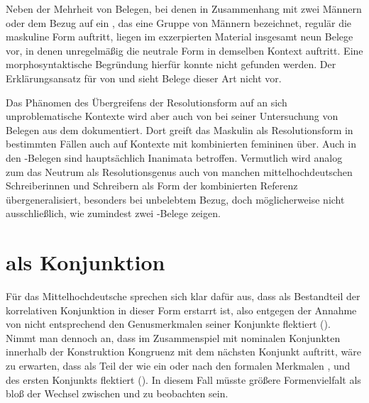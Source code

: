 Neben der Mehrheit von Belegen, bei denen in Zusammenhang mit zwei Männern oder
dem Bezug auf ein , das eine Gruppe von Männern bezeichnet,
regulär die maskuline Form  auftritt, liegen im exzerpierten
Material insgesamt neun Belege vor, in denen unregelmäßig die
neutrale Form  in demselben Kontext auftritt. Eine
morphosyntaktische Begründung hierfür konnte nicht gefunden werden. Der
Erklärungsansatz für  von \citet{wechsler2009} und
\citet{wechslerzlatic2003} sieht Belege dieser Art nicht vor.

Das Phänomen des Übergreifens der Resolutionsform auf an sich unproblematische
Kontexte wird aber auch von \citet[302]{corbett1991} bei seiner Untersuchung
von Belegen aus dem  dokumentiert. Dort greift das Maskulin als
Resolutionsform in bestimmten Fällen auch auf Kon\-texte mit kombinierten
femininen  über. Auch in den \CAO{}-Belegen sind hauptsächlich
Inanimata betroffen. Vermutlich wird analog zum  das Neutrum als
Resolutionsgenus auch von manchen
mittelhochdeutschen Schreiberinnen und Schreibern als
Form der kombinierten Referenz übergeneralisiert,
besonders bei unbelebtem Bezug, doch möglicherweise nicht ausschließlich, wie
zumindest zwei \KC-Belege zeigen.


\section{ als Konjunktion}
\label{sec:beideconj}

Für das Mittelhochdeutsche sprechen sich
\citet[626--627]{ksw2} klar dafür aus, dass  als Bestandteil der
korrelativen Konjunktion   in dieser Form erstarrt ist, also  entgegen der Annahme von
\citet{askedal1974} nicht entsprechend den Genusmerkmalen
seiner Konjunkte flektiert (). Nimmt man dennoch an,
dass im Zusammenspiel mit nominalen Konjunkten innerhalb der Konstruktion
Kongruenz mit dem nächsten Konjunkt auftritt, wäre zu
erwarten, dass  als Teil der  wie ein
 oder  nach den formalen
Merkmalen ,  und 
des ersten Konjunkts flektiert (). In diesem Fall müsste
größere Formenvielfalt als bloß der Wechsel zwischen  und
 zu beobachten sein.


